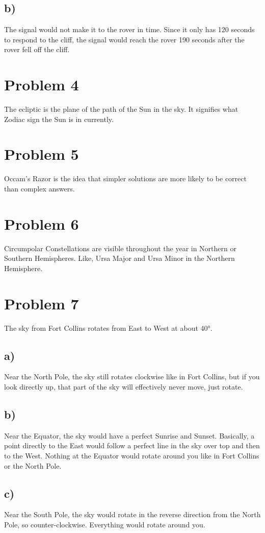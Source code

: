 \documentclass{article}
\begin{document}
\subsection*{b)}
The signal would not make it to the rover in time. Since it only has 120 seconds to respond to the cliff, the signal would reach the rover 190 seconds after the rover fell off the cliff.
\section*{Problem 4}
The ecliptic is the plane of the path of the Sun in the sky. It signifies what Zodiac sign the Sun is in currently.

\section*{Problem 5}
Occam's Razor is the idea that simpler solutions are more likely to be correct than complex answers.

\section*{Problem 6}
Circumpolar Constellations are visible throughout the year in Northern or Southern Hemispheres. Like, Ursa Major and Ursa Minor in the Northern Hemisphere.

\section*{Problem 7}
The sky from Fort Collins rotates from East to West at about \ang{40}.
\subsection*{a)}
Near the North Pole, the sky still rotates clockwise like in Fort Collins, but if you look directly up, that part of the sky will effectively never move, just rotate.
\subsection*{b)}
Near the Equator, the sky would have a perfect Sunrise and Sunset. Basically, a point directly to the East would follow a perfect line in the sky over top and then to the West. Nothing at the Equator would rotate around you like in Fort Collins or the North Pole.
\subsection*{c)}
Near the South Pole, the sky would rotate in the reverse direction from the North Pole, so counter-clockwise. Everything would rotate around you.
\end{document}
